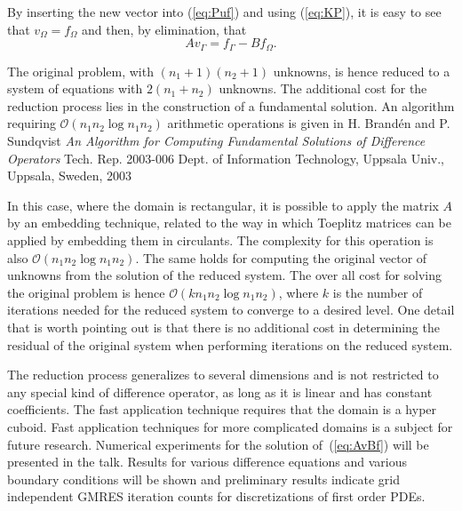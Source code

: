 \documentclass{report}
\begin{document}
By inserting the new vector into (\ref{eq:Puf}) and using
(\ref{eq:KP}), it is easy to see that $v_{\Omega}=f_{\Omega}$ and
then, by elimination, that
\begin{equation}
\label{eq:AvBf}
Av_{\Gamma}=f_{\Gamma}-Bf_{\Omega}.
\end{equation}

The original problem, with $(n_1+1)(n_2+1)$ unknowns, is hence reduced
to a system of equations with $2(n_1+n_2)$ unknowns. The additional
cost for the reduction process lies in the construction of a
fundamental solution. An algorithm requiring $\mathcal{O}(n_1n_2\log
n_1n_2)$ arithmetic operations is given in H. Brand\'en and P.
Sundqvist \emph{An Algorithm for Computing Fundamental Solutions of
Difference Operators} Tech. Rep. 2003-006 Dept. of Information
Technology, Uppsala Univ., Uppsala, Sweden, 2003

In this case, where the domain is rectangular, it is possible to apply
the matrix $A$ by an embedding technique, related to the way in which
Toeplitz matrices can be applied by embedding them in circulants. The
complexity for this operation is also $\mathcal{O}(n_1n_2\log
n_1n_2)$. The same holds for computing the original vector of
unknowns from the solution of the reduced system. The over all cost
for solving the original problem is hence $\mathcal{O}(k n_1n_2\log
n_1n_2)$, where $k$ is the number of iterations needed for the reduced
system to converge to a desired level. One detail that is worth
pointing out is that there is no additional cost in determining the
residual of the original system when performing iterations on the
reduced system.

The reduction process generalizes to several dimensions and is not
restricted to any special kind of difference operator, as long as it
is linear and has constant coefficients. The fast application
technique requires that the domain is a hyper cuboid. Fast application
techniques for more complicated domains is a subject for future
research. Numerical experiments for the solution of~(\ref{eq:AvBf})
will be presented in the talk. Results for various difference
equations and various boundary conditions will be shown and
preliminary results indicate grid independent GMRES iteration counts
for discretizations of first order PDEs.
\end{document}
